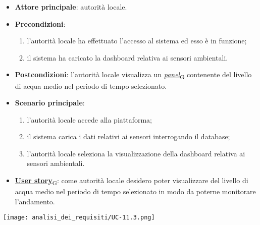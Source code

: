 \begin{itemize}
	\item \textbf{Attore principale}: autorità locale.
	\item \textbf{Precondizioni}:
	      \begin{enumerate}
		      \item l'autorità locale ha effettuato l'accesso al sistema ed esso è in funzione;
		      \item il sistema ha caricato la dashboard relativa ai sensori ambientali.
	      \end{enumerate}
	\item \textbf{Postcondizioni}: l'autorità locale visualizza un \href{https://7last.github.io/docs/rtb/documentazione-interna/glossario\#panel}{\textit{panel}\textsubscript{G}} contenente del livello di acqua medio nel periodo di tempo selezionato.
	\item \textbf{Scenario principale}:
	      \begin{enumerate}
		      \item l'autorità locale accede alla piattaforma;
		      \item il sistema carica i dati relativi ai sensori interrogando il database;
		      \item l'autorità locale seleziona la visualizzazione della dashboard relativa ai sensori ambientali.
	      \end{enumerate}
	\item \href{https://7last.github.io/docs/rtb/documentazione-interna/glossario\#user-story}{\textbf{User story}\textsubscript{G}}:
	      come autorità locale desidero poter visualizzare del livello di acqua medio nel periodo di tempo selezionato
	      in modo da poterne monitorare l'andamento.
\end{itemize}
\begin{center}
	\texttt{[image: analisi\_dei\_requisiti/UC-11.3.png]}
\end{center}


